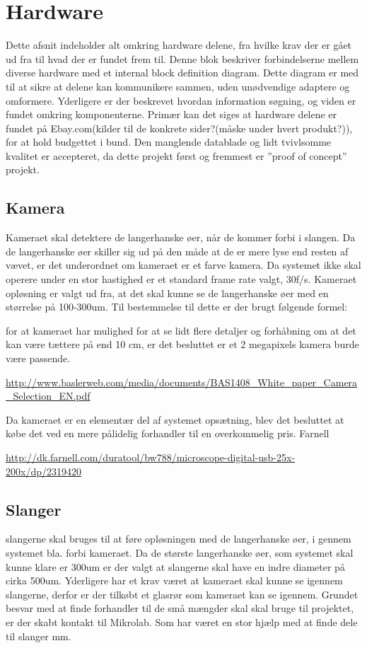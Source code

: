  \section{Hardware}
 Dette afsnit indeholder alt omkring hardware delene, fra hvilke krav der er gået ud fra til hvad der er fundet frem til. Denne blok beskriver forbindelserne mellem diverse hardware med et internal block definition diagram. Dette diagram er med til at sikre at delene kan kommunikere sammen, uden unødvendige adaptere og omformere. Yderligere er der beskrevet hvordan information søgning, og viden er fundet omkring komponenterne. Primær kan det siges at hardware delene er fundet på Ebay.com(kilder til de konkrete sider?(måske under hvert produkt?)), for at hold budgettet i bund. Den manglende datablade og lidt tvivlsomme kvalitet er accepteret, da dette projekt først og fremmest er  ”proof of concept” projekt.
 
\subsection{Kamera}
Kameraet skal detektere de langerhanske øer, når de kommer forbi i slangen.  Da de langerhanske øer skiller sig ud på den måde at de er mere lyse end resten af vævet, er det underordnet om kameraet er et farve kamera. Da systemet ikke skal operere under en stor hastighed er et standard frame rate valgt, 30f/s. Kameraet opløsning er valgt ud fra, at det skal kunne se de langerhanske øer med en størrelse på 100-300um. Til bestemmelse til dette er der brugt følgende formel:
 
for at kameraet har mulighed for at se lidt flere detaljer og forhåbning om at det kan være tættere på end 10 cm, er det besluttet er et 2 megapixels kamera burde være passende.

\url{http://www.baslerweb.com/media/documents/BAS1408_White_paper_Camera_Selection_EN.pdf}


Da kameraet er en elementær del af systemet opsætning, blev det besluttet at købe det ved en mere pålidelig forhandler til en overkommelig pris. Farnell


\url{http://dk.farnell.com/duratool/bw788/microscope-digital-usb-25x-200x/dp/2319420}
 
 \subsection{Slanger}
slangerne skal bruges til at føre opløsningen med de langerhanske øer, i gennem systemet bla. forbi kameraet. Da de største langerhanske øer, som systemet skal kunne klare er 300um er der valgt at slangerne skal have en indre diameter på cirka 500um. Yderligere har et krav været at kameraet skal kunne se igennem slangerne, derfor er der tilkøbt et glasrør som kameraet kan se igennem. Grundet besvar med at finde forhandler til de små mængder skal skal bruge til projektet, er der skabt kontakt til Mikrolab. Som har været en stor hjælp med at finde dele til slanger mm.

